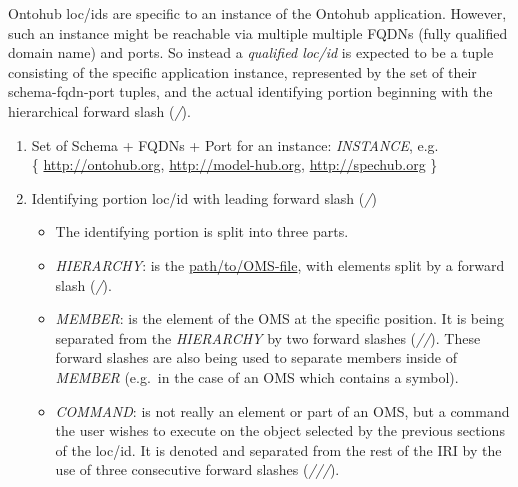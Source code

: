 \documentclass[10pt, a4paper]{isov2}
\begin{document}
Ontohub loc/ids are specific to an instance of the Ontohub application. However,
such an instance might be reachable via multiple multiple FQDNs (fully
qualified domain name) and ports. So instead a
\emph{qualified loc/id} is expected to be a tuple consisting of the specific application
instance, represented by the set of their schema-fqdn-port tuples, and the
actual identifying portion beginning with the hierarchical forward slash
(\emph{/}).




 \begin{enumerate} 
  \item Set of Schema + FQDNs + Port for an instance: \emph{INSTANCE}, e.g.\\
    \{ \url{http://ontohub.org}, \url{http://model-hub.org}, \url{http://spechub.org} \}
  \item Identifying portion loc/id with leading forward slash (\emph{/})
   \begin{itemize} 
    \item The identifying portion is split into three parts.
    \item \emph{HIERARCHY}: is the \url{path/to/OMS-file}, with elements
      split by a forward slash (\emph{/}).
    \item \emph{MEMBER}: is the element of the OMS at the specific
      position. It is being separated from the \emph{HIERARCHY} by two
      forward slashes (\emph{//}). These forward slashes are also being used to
      separate members inside of \emph{MEMBER} (e.g.\ in the case of an
      OMS which contains a symbol).
    \item \emph{COMMAND}: is not really an element or part of an OMS,
      but a command the user wishes to execute on the object selected by the
      previous sections of the loc/id. It is denoted and separated from the
      rest of the IRI by the use of three consecutive forward slashes
      (\emph{///}).
   \end{itemize} 
 \end{enumerate} 


\end{document}

